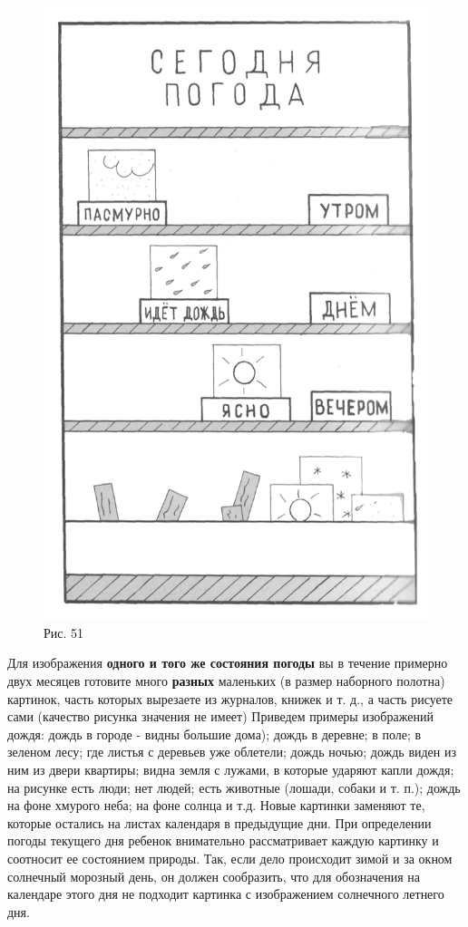 \documentclass[a5paper]{book}
\begin{document}
\begin{figure}
\centering
\includegraphics[width=0.8\linewidth]{media/media/image47.png}
\caption*{Рис. 51}
\end{figure}


Для изображения \textbf{одного и того же состояния погоды} вы в течение
примерно двух месяцев готовите много \textbf{разных} маленьких (в размер
наборного полотна) картинок, часть которых вырезаете из журналов, книжек
и т. д., а часть рисуете сами (качество рисунка значения не имеет)
Приведем примеры изображений дождя: дождь в городе - видны большие
дома); дождь в деревне; в поле; в зеленом лесу; где листья с деревьев
уже облетели; дождь ночью; дождь виден из ним из двери квартиры; видна
земля с лужами, в которые ударяют капли дождя; на рисунке есть люди; нет
людей; есть животные (лошади, собаки и т. п.); дождь на фоне хмурого
неба; на фоне солнца и т.д. Новые картинки заменяют те, которые остались
на листах календаря в предыдущие дни. При определении погоды текущего
дня ребенок внимательно рассматривает каждую картинку и соотносит ее
состоянием природы. Так, если дело происходит зимой и за окном солнечный
морозный день, он должен сообразить, что для обозначения на календаре
этого дня не подходит картинка с изображением солнечного летнего дня.
\end{document}
